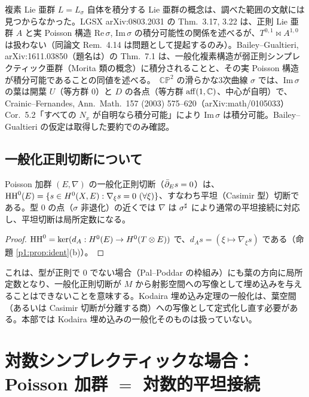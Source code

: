 \begin{rem}[\tC\ 積分可能性に関する注意]
複素 Lie 亜群 $L=L_\sigma$ 自体を積分する Lie 亜群の概念は、調べた範囲の文献には見つからなかった。LGSX arXiv:0803.2031 の Thm.\ 3.17, 3.22 は、正則 Lie 亜群 $A$ と実 Poisson 構造 $\mathrm{Re}\,\sigma$, $\mathrm{Im}\,\sigma$ の積分可能性の関係を述べるが、$T^{0,1}\bowtie A^{1,0}$ は扱わない（同論文 Rem.\ 4.14 は問題として提起するのみ）。Bailey--Gualtieri, arXiv:1611.03850（題名は\tQ）の Thm.\ 7.1 は、一般化複素構造が弱正則シンプレクティック亜群（Morita 類の概念）に積分されることと、その実 Poisson 構造が積分可能であることの同値を述べる。\tP\ $\mathbb{CP}^2$ の滑らかな3次曲線 $\sigma$ では、$\mathrm{Im}\,\sigma$ の葉は開葉 $U$（等方群 0）と $D$ の各点（等方群 $\mathrm{aff}(1,\mathbb C)$、中心が自明）で、Crainic--Fernandes, Ann.\ Math.\ 157 (2003) 575--620（arXiv:math/0105033）Cor.\ 5.2「すべての $N_x$ が自明なら積分可能」により $\mathrm{Im}\,\sigma$ は積分可能。Bailey--Gualtieri の仮定は取得した要約でのみ確認\tQ。
\end{rem}

\subsection{一般化正則切断について}\label{p1:sec:ghfun}
\begin{obs}\tP\label{p1:obs:casimir}
Poisson 加群 $(E,\nabla)$ の一般化正則切断（$\bar\partial_E s=0$）は、$\mathrm{HH}^0(E)=\{s\in H^0(X,E):\nabla_\xi s=0\ (\forall\xi)\}$、すなわち平坦（Casimir 型）切断である。型 0 の点（$\sigma$ 非退化）の近くでは $\nabla$ は $\sigma^\sharp$ により通常の平坦接続に対応し、平坦切断は局所定数になる。
\end{obs}
\begin{proof}
$\mathrm{HH}^0=\ker(d_A:H^0(E)\to H^0(T\otimes E))$ で、$d_A s=(\xi\mapsto\nabla_\xi s)$ である（命題 \ref{p1:prop:ident}(b)）。
\end{proof}
\begin{rem}\tK
これは、型が正則で 0 でない場合（Pal--Poddar の枠組み）にも葉の方向に局所定数となり、一般化正則切断が $M$ から射影空間への写像として埋め込みを与えることはできないことを意味する。Kodaira 埋め込み定理の一般化は、葉空間（あるいは Casimir 切断が分離する商）への写像として定式化し直す必要がある。本部では Kodaira 埋め込みの一般化そのものは扱っていない。
\end{rem}
\section{対数シンプレクティックな場合：Poisson 加群 $=$ 対数的平坦接続}\label{p1:sec:logsymp}
